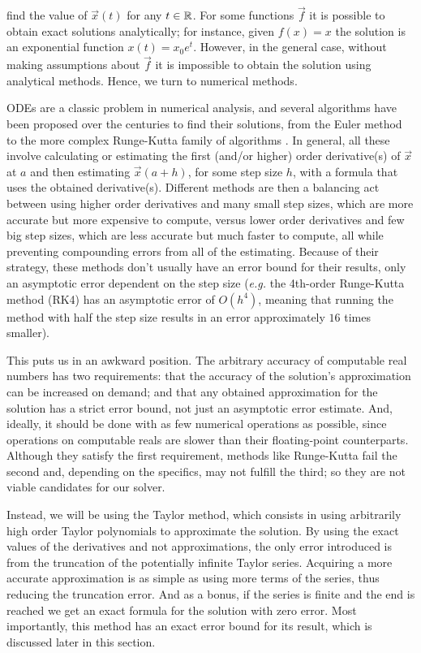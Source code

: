 find the value of $\vec{x}(t)$ for any $t \in \mathbb{R}$. For some functions $\vec{f}$ it is possible to obtain exact solutions analytically; for instance, given $f(x)=x$ the solution is an exponential function $x(t)=x_0 e^t$. However, in the general case, without making assumptions about $\vec{f}$ it is impossible to obtain the solution using analytical methods. Hence, we turn to numerical methods.

ODEs are a classic problem in numerical analysis, and several algorithms have been proposed over the centuries to find their solutions, from the Euler method to the more complex Runge-Kutta family of algorithms \cite{Butcher16}. In general, all these involve calculating or estimating the first (and/or higher) order derivative(s) of $\vec{x}$ at $a$ and then estimating $\vec{x}(a+h)$, for some step size $h$, with a formula that uses the obtained derivative(s). Different methods are then a balancing act between using higher order derivatives and many small step sizes, which are more accurate but more expensive to compute, versus lower order derivatives and few big step sizes, which are less accurate but much faster to compute, all while preventing compounding errors from all of the estimating. Because of their strategy, these methods don't usually have an error bound for their results, only an asymptotic error dependent on the step size (\textit{e.g.} the 4th-order Runge-Kutta method (RK4) has an asymptotic error of $O(h^4)$, meaning that running the method with half the step size results in an error approximately $16$ times smaller).

This puts us in an awkward position. The arbitrary accuracy of computable real numbers has two requirements: that the accuracy of the solution's approximation can be increased on demand; and that any obtained approximation for the solution has a strict error bound, not just an asymptotic error estimate. And, ideally, it should be done with as few numerical operations as possible, since operations on computable reals are slower than their floating-point counterparts. Although they satisfy the first requirement, methods like Runge-Kutta fail the second and, depending on the specifics, may not fulfill the third; so they are not viable candidates for our solver.

Instead, we will be using the Taylor method, which consists in using arbitrarily high order Taylor polynomials to approximate the solution. By using the exact values of the derivatives and not approximations, the only error introduced is from the truncation of the potentially infinite Taylor series. Acquiring a more accurate approximation is as simple as using more terms of the series, thus reducing the truncation error. And as a bonus, if the series is finite and the end is reached we get an exact formula for the solution with zero error. Most importantly, this method has an exact error bound for its result, which is discussed later in this section.

